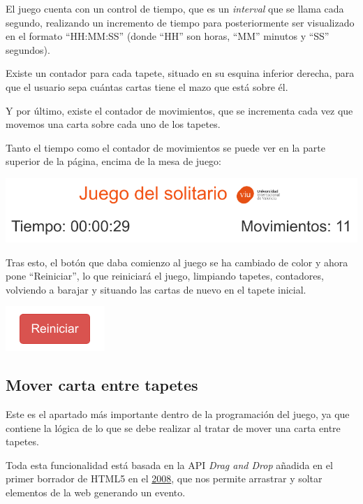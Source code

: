 \documentclass{\ClassPath/viu-tfm-template}
\begin{document}
El juego cuenta con un control de tiempo, que es un \textit{interval} que se llama cada segundo, realizando un incremento de tiempo para posteriormente ser visualizado en el formato “HH:MM:SS” (donde “HH” son horas, “MM” minutos y “SS” segundos).

Existe un contador para cada tapete, situado en su esquina inferior derecha, para que el usuario sepa cuántas cartas tiene el mazo que está sobre él.

Y por último, existe el contador de movimientos, que se incrementa cada vez que movemos una carta sobre cada uno de los tapetes.

Tanto el tiempo como el contador de movimientos se puede ver en la parte superior de la página, encima de la mesa de juego:

\vspace{-1em}
\begin{center}
    \includegraphics[frame,width=0.8\linewidth]{img/cabecera.png}
\end{center}
\vspace{-1em}

Tras esto, el botón que daba comienzo al juego se ha cambiado de color y ahora pone “Reiniciar”, lo que reiniciará el juego, limpiando tapetes, contadores, volviendo a barajar y situando las cartas de nuevo en el tapete inicial.

\vspace{-1.6em}
\begin{center}
    \includegraphics[width=0.2\linewidth]{img/reiniciar.png}
\end{center}
\vspace{-1em}


\subsection{Mover carta entre tapetes}
Este es el apartado más importante dentro de la programación del juego, ya que contiene la lógica de lo que se debe realizar al tratar de mover una carta entre tapetes.

Toda esta funcionalidad está basada en la API \textit{Drag and Drop} añadida en el primer borrador de HTML5 en el \href{https://www.w3.org/TR/2008/WD-html5-20080122/#dnd}{2008}, que nos permite arrastrar y soltar elementos de la web generando un evento.
\end{document}
